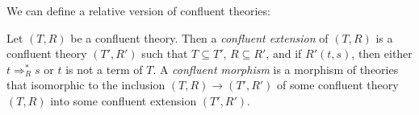 \documentclass[reqno]{amsart}
\theoremstyle{definition}
\theoremstyle{remark}
\newcommand{\repl}{:=}
\numberwithin{figure}{section}
\begin{document}
We can define a relative version of confluent theories:

\begin{defn}
Let $(T,R)$ be a confluent theory.
Then a \emph{confluent extension} of $(T,R)$ is a confluent theory $(T',R')$ such that $T \subseteq T'$, $R \subseteq R'$, and if $R'(t,s)$, then either $t \Rightarrow_R^* s$ or $t$ is not a term of $T$.
A \emph{confluent morphism} is a morphism of theories that isomorphic to the inclusion $(T,R) \to (T',R')$ of some confluent theory $(T,R)$ into some confluent extension $(T',R')$.
\end{defn}

\begin{comment}
Often axioms of a type theory are defined in terms of a reduction relation, which satisfies some additional properties such as confluence and strong normalization.
It turns out that the confluence condition is also useful in our context.
Let $T$ be a theory and let $R$ be a binary relation on the set of terms of $T$.
Let $\Rightarrow_R$ be the relation defined as follows: if $R(t,s)$, then $c[x \repl t[x_1 \repl t_1, \ldots x_k \repl t_k]] \Rightarrow_R c[x \repl s[x_1 \repl t_1, \ldots x_k \repl t_k]]$ for all $c$, $x_1$, \ldots $x_k$, and $t_1$, \ldots $t_k$.
Let $\Rightarrow_R^*$ be the reflexive transitive closure of $\Rightarrow_R$.

If $R$ is a relation on the set of terms of a theory $T$, then we define an extension of $T$, which we denote by $(T,R)$.
It has the same function and predicate symbols as $T$.
The axioms of $(T,R)$ are the axioms of $T$ together with the axiom $t\!\downarrow\ \sststile{}{V} t = s$ for every pair of terms $t$ and $s$ such that $R(t,s)$.

\begin{defn}
We will say that a relation $R$ on the set of terms of a theory $T$ is \emph{confluent} if the following conditions hold:
\begin{enumerate}
\item If $R(t,s)$, then $FV(s) \subseteq FV(t)$.
\item If $R(t,s)$, then $t$ is not a variable.
\item If $R(t,s)$, then there is at most one occurrence of each variable in $t$.
\item If $t \Rightarrow_R^* t_1$ and $t \Rightarrow_R^* t_2$, then there exist terms $s_1$ and $s_2$ such that $t_1 \Rightarrow_R^* s_1$, $t_2 \Rightarrow_R^* s_2$ and $\sststile{T}{V} s_1 \cong s_2$.
\end{enumerate}


\end{comment}
\end{document}
